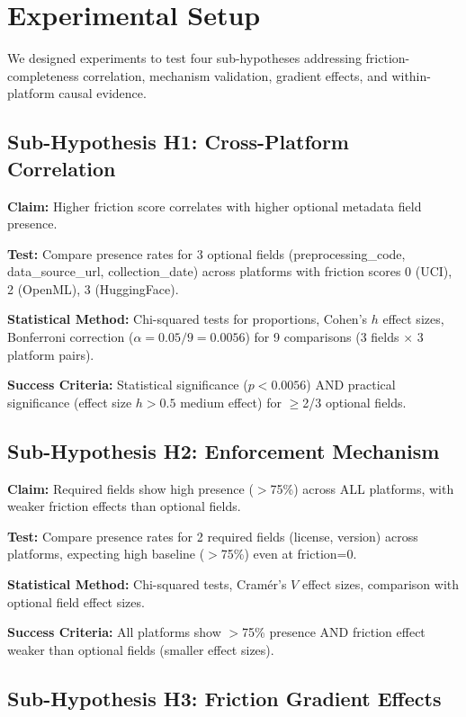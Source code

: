 \section{Experimental Setup}
\label{sec:experiments}

We designed experiments to test four sub-hypotheses addressing friction-completeness correlation, mechanism validation, gradient effects, and within-platform causal evidence.

\subsection{Sub-Hypothesis H1: Cross-Platform Correlation}

\textbf{Claim:} Higher friction score correlates with higher optional metadata field presence.

\textbf{Test:} Compare presence rates for 3 optional fields (preprocessing\_code, data\_source\_url, collection\_date) across platforms with friction scores 0 (UCI), 2 (OpenML), 3 (HuggingFace).

\textbf{Statistical Method:} Chi-squared tests for proportions, Cohen's $h$ effect sizes, Bonferroni correction ($\alpha=0.05/9=0.0056$) for 9 comparisons (3 fields $\times$ 3 platform pairs).

\textbf{Success Criteria:} Statistical significance ($p<0.0056$) AND practical significance (effect size $h>0.5$ medium effect) for $\geq$2/3 optional fields.

\subsection{Sub-Hypothesis H2: Enforcement Mechanism}

\textbf{Claim:} Required fields show high presence ($>$75\%) across ALL platforms, with weaker friction effects than optional fields.

\textbf{Test:} Compare presence rates for 2 required fields (license, version) across platforms, expecting high baseline ($>$75\%) even at friction=0.

\textbf{Statistical Method:} Chi-squared tests, Cramér's $V$ effect sizes, comparison with optional field effect sizes.

\textbf{Success Criteria:} All platforms show $>$75\% presence AND friction effect weaker than optional fields (smaller effect sizes).

\subsection{Sub-Hypothesis H3: Friction Gradient Effects}

